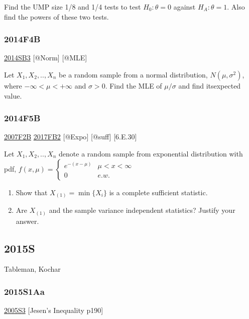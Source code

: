 \documentclass[6pt,Portrait]{article}
\begin{document}
Find the UMP size 1/8 and 1/4 tests to test \(H_0:\theta=0\) against
\(H_A:\theta=1\). Also find the powers of these two tests.

\hypertarget{f4b-1}{%
\subsubsection{2014F4B}\label{f4b-1}}

\protect\hyperlink{sb3-2}{2014SB3} {[}@Norm{]} {[}@MLE{]}

Let \(X_1,X_2,..,X_{n}\) be a random sample from a normal distribution,
\(N(\mu,\sigma^2)\), where \(-\infty<\mu<+\infty\) and \(\sigma>0\).
Find the MLE of \(\mu/\sigma\) and find itsexpected value.

\hypertarget{f5b-1}{%
\subsubsection{2014F5B}\label{f5b-1}}

\protect\hyperlink{f2b}{2007F2B} \protect\hyperlink{fb2-3}{2017FB2}
{[}@Expo{]} {[}@suff{]} {[}6.E.30{]}

Let \(X_1,X_2,..,X_{n}\) denote a random sample from exponential
distribution with pdf,
\(f(x,\mu)=\begin{cases}e^{-(x-\mu)}& \mu<x<\infty\\0& e.w.\end{cases}\)

\begin{enumerate}
\def\labelenumi{(\alph{enumi})}
\item
  Show that \(X_{(1)}=\min\{X_i\}\) is a complete sufficient statistic.
\item
  Are \(X_{(1)}\) and the sample variance independent statistics?
  Justify your answer.
\end{enumerate}

\hypertarget{s-8}{%
\subsection{2015S}\label{s-8}}

Tableman, Kochar

\hypertarget{s1aa}{%
\subsubsection{2015S1Aa}\label{s1aa}}

\protect\hyperlink{s3-1}{2005S3} {[}Jesen's Inequality p190{]}
\end{document}
